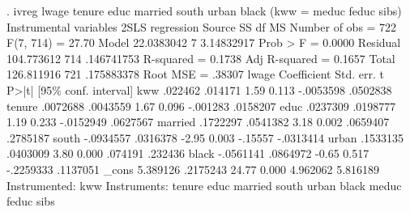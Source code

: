 . ivreg lwage tenure educ married south urban black (kww = meduc feduc sibs)
{\smallskip}
Instrumental variables 2SLS regression
{\smallskip}
      Source {\VBAR}       SS           df       MS      Number of obs   =       722
   F(7, 714)       =     27.70
       Model {\VBAR}  22.0383042         7  3.14832917   Prob > F        =    0.0000
    Residual {\VBAR}  104.773612       714  .146741753   R-squared       =    0.1738
   Adj R-squared   =    0.1657
       Total {\VBAR}  126.811916       721  .175883378   Root MSE        =    .38307
{\smallskip}
       lwage {\VBAR} Coefficient  Std. err.      t    P>|t|     [95\% conf. interval]
         kww {\VBAR}    .022462    .014171     1.59   0.113    -.0053598    .0502838
      tenure {\VBAR}   .0072688   .0043559     1.67   0.096     -.001283    .0158207
        educ {\VBAR}   .0237309   .0198777     1.19   0.233    -.0152949    .0627567
     married {\VBAR}   .1722297   .0541382     3.18   0.002     .0659407    .2785187
       south {\VBAR}  -.0934557   .0316378    -2.95   0.003      -.15557   -.0313414
       urban {\VBAR}   .1533135   .0403009     3.80   0.000      .074191     .232436
       black {\VBAR}  -.0561141   .0864972    -0.65   0.517    -.2259333    .1137051
       _cons {\VBAR}   5.389126   .2175243    24.77   0.000     4.962062    5.816189
Instrumented: kww
 Instruments: tenure educ married south urban black meduc feduc sibs
{\smallskip}
